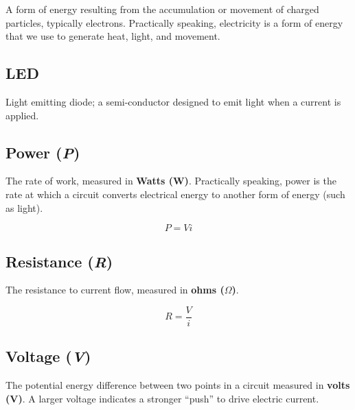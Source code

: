 \documentclass[]{book}
\begin{document}
A form of energy resulting from the accumulation or movement of charged particles, typically electrons. Practically speaking, electricity is a form of energy that we use to generate heat, light, and movement.

\hypertarget{led}{%
\subsection*{LED}\label{led}}

Light emitting diode; a semi-conductor designed to emit light when a current is applied.

\hypertarget{power-p}{%
\subsection*{\texorpdfstring{Power (\emph{P})}{Power (P)}}\label{power-p}}

The rate of work, measured in \textbf{Watts (W)}. Practically speaking, power is the rate at which a circuit converts electrical energy to another form of energy (such as light).

\[
P = V i
\]

\hypertarget{resistance-r}{%
\subsection*{\texorpdfstring{Resistance (\emph{R})}{Resistance (R)}}\label{resistance-r}}

The resistance to current flow, measured in \textbf{ohms (\(\Omega\))}.

\[
R = \frac{V}{i}
\]

\hypertarget{voltage-v}{%
\subsection*{\texorpdfstring{Voltage (\emph{V})}{Voltage (V)}}\label{voltage-v}}

The potential energy difference between two points in a circuit measured in \textbf{volts (V)}. A larger voltage indicates a stronger ``push'' to drive electric current.


\end{document}
